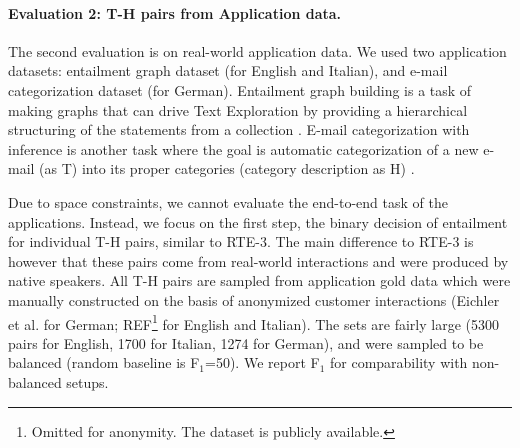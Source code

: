 \documentclass[11pt,letterpaper]{article}
\begin{document}
\paragraph{Evaluation 2: T-H pairs from Application data.}
The second evaluation is on real-world application data. We used two 
application datasets: entailment graph dataset (for English and
Italian), and e-mail categorization dataset (for German).   
Entailment graph building is a task of making graphs that can drive
Text Exploration by providing a hierarchical structuring of the
statements from a collection \cite{berant2012learning}. E-mail
categorization with inference is another task where the goal is
automatic categorization of a new e-mail (as T) into its proper
categories (category description as H) \cite{Eichler:2014}.  

Due to space constraints, we cannot evaluate the end-to-end task of
the applications. Instead, we focus on the first step, the binary
decision of entailment for individual T-H pairs, similar to RTE-3. 
The main difference to RTE-3 is however that these pairs come from
real-world interactions and were produced by native speakers. 
All T-H pairs %
are sampled from application gold data which were manually constructed
on the basis of anonymized customer interactions (Eichler et
al.  for German; REF\footnote{Omitted for
  anonymity. The dataset is publicly available.} for English and
Italian). The sets are fairly large (5300 pairs for English, 1700 for
Italian, 1274 for German), and were sampled to be balanced (random
baseline is F$_1$=50). We report F$_1$ for comparability with
non-balanced setups.  


\end{document}
